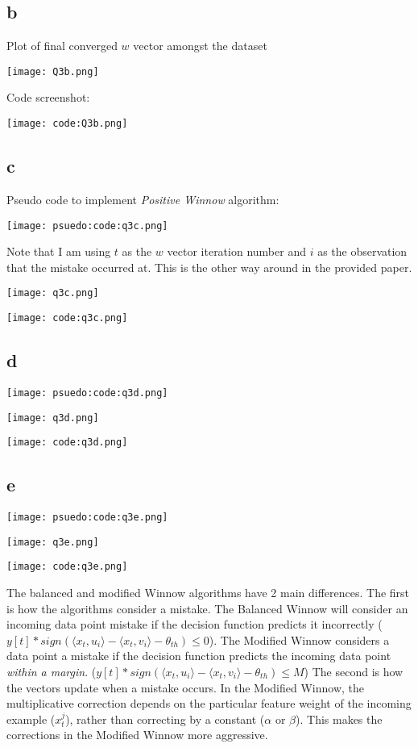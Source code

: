 \documentclass{article}
\begin{document}
\subsection*{b}

Plot of final converged \(w\) vector amongst the dataset

\texttt{[image: Q3b.png]}

Code screenshot: 

\texttt{[image: code:Q3b.png]}

\newpage
\subsection*{c}

Pseudo code to implement \emph{Positive Winnow} algorithm:

\texttt{[image: psuedo:code:q3c.png]}

Note that I am using \(t\) as the \(w\) vector iteration number and \(i\) as the observation that the mistake
occurred at. This is the other way around in the provided paper.

\texttt{[image: q3c.png]}

\texttt{[image: code:q3c.png]}

\newpage
\subsection*{d}

\texttt{[image: psuedo:code:q3d.png]}

\texttt{[image: q3d.png]}

\texttt{[image: code:q3d.png]}

\subsection*{e}

\texttt{[image: psuedo:code:q3e.png]}

\texttt{[image: q3e.png]}

\texttt{[image: code:q3e.png]}

The balanced and modified Winnow algorithms have 2 main differences. The first is
how the algorithms consider a mistake. The Balanced Winnow will consider an incoming 
data point mistake if the decision function predicts it incorrectly 
(\(y[t] * sign(\langle x_{t}, u_{i} \rangle - \langle x_{t}, v_{i} \rangle - \theta_{th}) \leq 0\)).
The Modified Winnow considers a data point a mistake if the decision function predicts
the incoming data point \emph{within a margin}. 
(\(y[t] * sign(\langle x_{t}, u_{i} \rangle - \langle x_{t}, v_{i} \rangle - \theta_{th}) \leq M\))
The second is how the vectors update when a mistake occurs. In the Modified Winnow, the multiplicative correction 
depends on the particular feature weight of the incoming example (\(x_{t}^{j}\)), rather than 
correcting by a constant (\(\alpha\) or \(\beta\)). This makes the corrections
in the Modified Winnow more aggressive.
\end{document}
